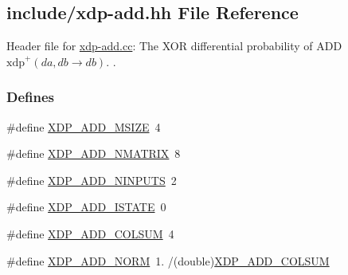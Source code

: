 \hypertarget{xdp-add_8hh}{\subsection{include/xdp-\/add.hh \-File \-Reference}
\label{xdp-add_8hh}
}


\-Header file for \hyperlink{xdp-add_8cc}{xdp-\/add.\-cc}\-: \-The \-X\-O\-R differential probability of \-A\-D\-D $\mathrm{xdp}^{+}(da,db \rightarrow db)$. .  


\subsubsection*{\-Defines}
\begin{DoxyCompactItemize}
\item 
\#define \hyperlink{xdp-add_8hh_ab4682e30389129be27b47c6ad0f7ecee}{\-X\-D\-P\-\_\-\-A\-D\-D\-\_\-\-M\-S\-I\-Z\-E}~4
\item 
\#define \hyperlink{xdp-add_8hh_a96b4b847e9c43d0a440192f1a8667225}{\-X\-D\-P\-\_\-\-A\-D\-D\-\_\-\-N\-M\-A\-T\-R\-I\-X}~8
\item 
\#define \hyperlink{xdp-add_8hh_af4d73b89293ebb40f772556f29b9898b}{\-X\-D\-P\-\_\-\-A\-D\-D\-\_\-\-N\-I\-N\-P\-U\-T\-S}~2
\item 
\#define \hyperlink{xdp-add_8hh_a568bedde4a45fb1cb5591549f90303e1}{\-X\-D\-P\-\_\-\-A\-D\-D\-\_\-\-I\-S\-T\-A\-T\-E}~0
\item 
\#define \hyperlink{xdp-add_8hh_aeb8ed0e44f09ad721abf655bae8e986a}{\-X\-D\-P\-\_\-\-A\-D\-D\-\_\-\-C\-O\-L\-S\-U\-M}~4
\item 
\#define \hyperlink{xdp-add_8hh_a00dca40fce3b5ac8e3e751e1399f691d}{\-X\-D\-P\-\_\-\-A\-D\-D\-\_\-\-N\-O\-R\-M}~1. /(double)\hyperlink{xdp-add_8hh_aeb8ed0e44f09ad721abf655bae8e986a}{\-X\-D\-P\-\_\-\-A\-D\-D\-\_\-\-C\-O\-L\-S\-U\-M}
\end{DoxyCompactItemize}
